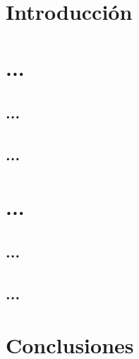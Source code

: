 \section{Introducción}

\section{...}
\subsection{...}

\subsection{...}

\section{...}

\subsection{...}

\subsection{...}

\section{Conclusiones}